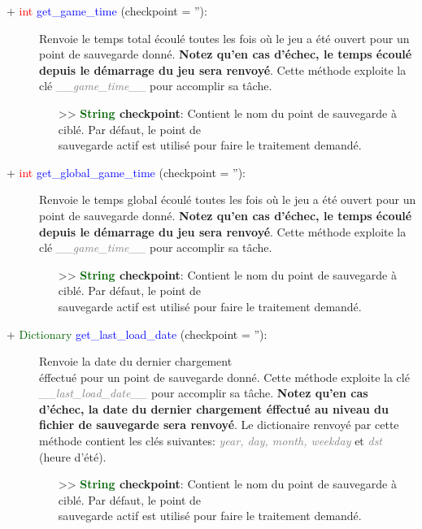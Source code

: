 \documentclass[a4paper, 11pt]{article}
\begin{document}
	\begin{description}
		\item [+ \textcolor{red}{int} \textcolor{blue}{get\_game\_time} (checkpoint = ''):] Renvoie le temps
		total écoulé toutes les fois où le jeu a été ouvert pour un point de sauvegarde donné. \textbf{Notez 
		qu'en cas d'échec, le temps écoulé depuis le démarrage du jeu sera renvoyé}. Cette méthode exploite
		la clé \textit{\textcolor{gray}{\_\_game\_time\_\_}} pour accomplir sa tâche.
		\begin{itemize}
			\item [>> \textbf{\textcolor{darkgreen}{String} checkpoint}:] Contient le nom du point de 
			sauvegarde à ciblé. Par défaut, le point de \\sauvegarde actif est utilisé pour faire le
			traitement demandé.\\
		\end{itemize}
	\end{description}
	\begin{description}
		\item [+ \textcolor{red}{int} \textcolor{blue}{get\_global\_game\_time} (checkpoint = ''):] Renvoie
		le temps global écoulé toutes les fois où le jeu a été ouvert pour un point de sauvegarde donné.
		\textbf{Notez qu'en cas d'échec, le temps écoulé depuis le démarrage du jeu sera renvoyé}. Cette
		méthode exploite la clé \textit{\textcolor{gray}{\_\_game\_time\_\_}} pour accomplir sa tâche.
		\begin{itemize}
			\item [>> \textbf{\textcolor{darkgreen}{String} checkpoint}:] Contient le nom du point de 
			sauvegarde à ciblé. Par défaut, le point de \\sauvegarde actif est utilisé pour faire le
			traitement demandé.\\
		\end{itemize}
	\end{description}
	\begin{description}
		\item [+ \textcolor{darkgreen}{Dictionary} \textcolor{blue}{get\_last\_load\_date} (checkpoint =
		''):] Renvoie la date du dernier chargement \\éffectué pour un point de sauvegarde donné. Cette
		méthode exploite la clé \textit{\textcolor {gray}{\_\_last\_load\_date\_\_}} pour accomplir sa
		tâche. \textbf{Notez qu'en cas d'échec, la date du dernier chargement éffectué au niveau du fichier
		de sauvegarde sera renvoyé}. Le dictionaire renvoyé par cette méthode contient les clés suivantes:
		\textit{\textcolor{gray}{year, day, month, weekday}} et \textit{\textcolor{gray}{dst}} (heure
		d'été).
		\begin{itemize}
			\item [>> \textbf{\textcolor{darkgreen}{String} checkpoint}:] Contient le nom du point de 
			sauvegarde à ciblé. Par défaut, le point de \\sauvegarde actif est utilisé pour faire le
			traitement demandé.\\
		\end{itemize}
	\end{description}
\end{document}
